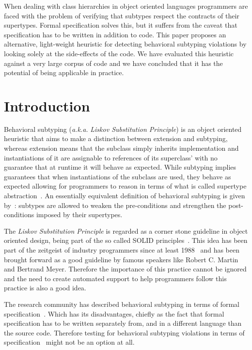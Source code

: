 \documentclass{acm_proc_article-sp}
\begin{document}
\abstract
When dealing with class hierarchies in object oriented languages programmers are faced with the problem of verifying that subtypes respect the contracts of their supertypes. Formal specification solves this, but it suffers from the caveat that specification has to be written in addition to code. This paper proposes an alternative, light-weight heuristic for detecting behavioral subtyping violations by looking solely at the side-effects of the code. We have evaluated this heuristic against a very large corpus of code and we have concluded that it has the potential of being applicable in practice. 

\section{Introduction}\label{section:intro}
Behavioral subtyping (\emph{a.k.a.} \emph{Liskov Substitution Principle}) is an object oriented heuristic that aims to make a distinction between extension and subtyping, whereas extension means that the subclass simply inherits implementation and instantiations of it are assignable to references of its superclass' with no guarantee that at runtime it will behave as expected. While subtyping implies guarantees that when instantiations of the subclass are used, they behave as expected allowing for programmers to reason in terms of what is called supertype abstraction~\cite{leavens1995specification}. An essentially equivalent definition of behavioral subtyping is given by~\cite{america1991designing, liskov1994behavioral, liskov1999behavioral, meyer1988object}: subtypes are allowed to weaken the pre-conditions and strengthen the post-conditions imposed by their supertypes.

The \emph{Liskov Substitution Principle} is regarded as a corner stone guideline in object oriented design, being part of the so called SOLID principles~\cite{martin2000design, martin2003agile}. This idea has been part of the zeitgeist of industry programmers since at least 1988~\cite{meyer1988object} and has been brought forward as a good guideline by famous speakers like Robert C. Martin and Bertrand Meyer. Therefore the importance of this practice cannot be ignored and the need to create automated support to help programmers follow this practice is also a good idea. 

The research community has described behavioral subtyping in terms of formal specification~\cite{america1991designing, liskov1994behavioral, liskov1999behavioral}. Which has its disadvantages, chiefly as the fact that formal specification has to be written separately from, and in a different language than the source code. Therefore testing for behavioral subtyping violations in terms of specification~\cite{duncan1998adding, leavens2006jml, karaorman1999jcontractor, findler2001behavioral} might not be an option at all. 
\end{document}
